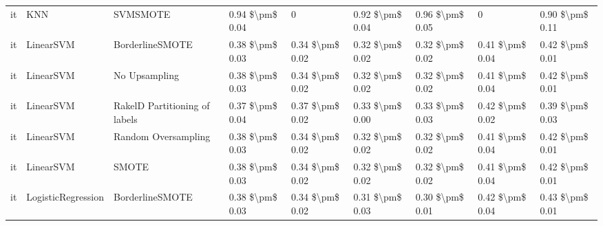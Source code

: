\begin{tabular}{lllllllll}
      it &                             KNN &                      SVMSMOTE &     0.94 \$\textbackslash pm\$ 0.04 &                         0 &       0.92 \$\textbackslash pm\$ 0.04 &        0.96 \$\textbackslash pm\$ 0.05 &                                       0 &     0.90 \$\textbackslash pm\$ 0.11 \\
      it &                       LinearSVM &               BorderlineSMOTE &     0.38 \$\textbackslash pm\$ 0.03 &           0.34 \$\textbackslash pm\$ 0.02 &       0.32 \$\textbackslash pm\$ 0.02 &        0.32 \$\textbackslash pm\$ 0.02 &                         0.41 \$\textbackslash pm\$ 0.04 &     0.42 \$\textbackslash pm\$ 0.01 \\
      it &                       LinearSVM &                 No Upsampling &     0.38 \$\textbackslash pm\$ 0.03 &           0.34 \$\textbackslash pm\$ 0.02 &       0.32 \$\textbackslash pm\$ 0.02 &        0.32 \$\textbackslash pm\$ 0.02 &                         0.41 \$\textbackslash pm\$ 0.04 &     0.42 \$\textbackslash pm\$ 0.01 \\
      it &                       LinearSVM & RakelD Partitioning of labels &     0.37 \$\textbackslash pm\$ 0.04 &           0.37 \$\textbackslash pm\$ 0.02 &       0.33 \$\textbackslash pm\$ 0.00 &        0.33 \$\textbackslash pm\$ 0.03 &                         0.42 \$\textbackslash pm\$ 0.02 &     0.39 \$\textbackslash pm\$ 0.03 \\
      it &                       LinearSVM &           Random Oversampling &     0.38 \$\textbackslash pm\$ 0.03 &           0.34 \$\textbackslash pm\$ 0.02 &       0.32 \$\textbackslash pm\$ 0.02 &        0.32 \$\textbackslash pm\$ 0.02 &                         0.41 \$\textbackslash pm\$ 0.04 &     0.42 \$\textbackslash pm\$ 0.01 \\
      it &                       LinearSVM &                         SMOTE &     0.38 \$\textbackslash pm\$ 0.03 &           0.34 \$\textbackslash pm\$ 0.02 &       0.32 \$\textbackslash pm\$ 0.02 &        0.32 \$\textbackslash pm\$ 0.02 &                         0.41 \$\textbackslash pm\$ 0.04 &     0.42 \$\textbackslash pm\$ 0.01 \\
      it &              LogisticRegression &               BorderlineSMOTE &     0.38 \$\textbackslash pm\$ 0.03 &           0.34 \$\textbackslash pm\$ 0.02 &       0.31 \$\textbackslash pm\$ 0.03 &        0.30 \$\textbackslash pm\$ 0.01 &                         0.42 \$\textbackslash pm\$ 0.04 &     0.43 \$\textbackslash pm\$ 0.01 \\

\end{tabular}
